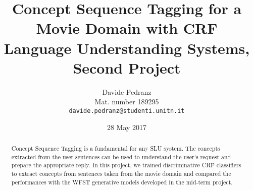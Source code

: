 \documentclass[11pt,a4paper]{article}
\title{
  Concept Sequence Tagging for a Movie Domain with CRF \\
  Language Understanding Systems, Second Project
}
\author{Davide Pedranz \\
  Mat. number 189295 \\
  {\tt davide.pedranz@studenti.unitn.it}
}
\date{28 May 2017}
\begin{document}
\maketitle

\begin{abstract}
Concept Sequence Tagging is a fundamental for any \ac{SLU} system.
The concepts extracted from the user sentences can be used to understand the user's request and prepare the appropriate reply.
In this project, we trained discriminative \ac{CRF} classifiers to extract concepts from sentences taken from the movie domain and compared the performances with the \ac{WFST} generative models developed in the mid-term project.
\end{abstract}








\end{document}
